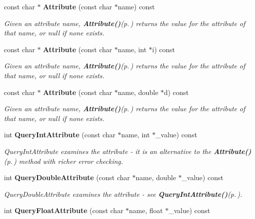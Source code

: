 \begin{CompactItemize}
\item 
const char $\ast$ {\bf Attribute} (const char $\ast$name) const
\begin{CompactList}\small\item\em Given an attribute name, {\bf Attribute()}{\rm (p.\,\pageref{classTiXmlElement_TiXmlElementa5})} returns the value for the attribute of that name, or null if none exists. \item\end{CompactList}\item 
const char $\ast$ {\bf Attribute} (const char $\ast$name, int $\ast$i) const
\begin{CompactList}\small\item\em Given an attribute name, {\bf Attribute()}{\rm (p.\,\pageref{classTiXmlElement_TiXmlElementa5})} returns the value for the attribute of that name, or null if none exists. \item\end{CompactList}\item 
const char $\ast$ {\bf Attribute} (const char $\ast$name, double $\ast$d) const
\begin{CompactList}\small\item\em Given an attribute name, {\bf Attribute()}{\rm (p.\,\pageref{classTiXmlElement_TiXmlElementa5})} returns the value for the attribute of that name, or null if none exists. \item\end{CompactList}\item 
int {\bf Query\-Int\-Attribute} (const char $\ast$name, int $\ast$\_\-value) const
\begin{CompactList}\small\item\em Query\-Int\-Attribute examines the attribute - it is an alternative to the {\bf Attribute()}{\rm (p.\,\pageref{classTiXmlElement_TiXmlElementa5})} method with richer error checking. \item\end{CompactList}\item 
int {\bf Query\-Double\-Attribute} (const char $\ast$name, double $\ast$\_\-value) const\label{classTiXmlElement_TiXmlElementa9}

\begin{CompactList}\small\item\em Query\-Double\-Attribute examines the attribute - see {\bf Query\-Int\-Attribute()}{\rm (p.\,\pageref{classTiXmlElement_TiXmlElementa8})}. \item\end{CompactList}\item 
int {\bf Query\-Float\-Attribute} (const char $\ast$name, float $\ast$\_\-value) const\label{classTiXmlElement_TiXmlElementa10}


\end{CompactItemize}
